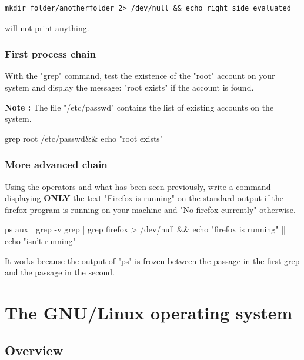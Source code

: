 \documentclass[11pt]{article}
\begin{document}
\begin{lstlisting}
mkdir folder/anotherfolder 2> /dev/null && echo right side evaluated
\end{lstlisting}
will not print anything.

\subsubsection{First process chain}

With the "grep" command, test the existence of the "root" account on your system and display the message: "root exists" if the account is found.

\textbf{Note :} The file "/etc/passwd" contains the list of existing accounts on the system.

\begin{solution}
	grep root /etc/passwd\&\& echo "root exists"
\end{solution}

\subsubsection{More advanced chain}
Using the operators and what has been seen previously, write a command displaying \textbf{ONLY} the text "Firefox is running" on the standard output if the firefox program is running on your machine and "No firefox currently" otherwise.


\begin{solution}
	ps aux | grep -v grep | grep firefox > /dev/null \&\& echo "firefox is running" || echo "isn't running"
	
	It works because the output of "ps" is frozen between the passage in the first grep and the passage in the second.
	
\end{solution}

\section{The GNU/Linux operating system}

\subsection{Overview}
\end{document}
